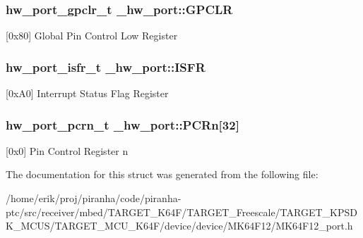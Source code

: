 \subsubsection[{\texorpdfstring{G\+P\+C\+LR}{GPCLR}}]{ {\bf hw\+\_\+port\+\_\+gpclr\+\_\+t} \+\_\+hw\+\_\+port\+::\+G\+P\+C\+LR}\hypertarget{struct__hw__port_a7be1ea0e268b67694b7a5b26c162271c}{}\label{struct__hw__port_a7be1ea0e268b67694b7a5b26c162271c}
\mbox{[}0x80\mbox{]} Global Pin Control Low Register 
\subsubsection[{\texorpdfstring{I\+S\+FR}{ISFR}}]{ {\bf hw\+\_\+port\+\_\+isfr\+\_\+t} \+\_\+hw\+\_\+port\+::\+I\+S\+FR}\hypertarget{struct__hw__port_add269ad945dcbd8df299be8865de7619}{}\label{struct__hw__port_add269ad945dcbd8df299be8865de7619}
\mbox{[}0x\+A0\mbox{]} Interrupt Status Flag Register 
\subsubsection[{\texorpdfstring{P\+C\+Rn}{PCRn}}]{ {\bf hw\+\_\+port\+\_\+pcrn\+\_\+t} \+\_\+hw\+\_\+port\+::\+P\+C\+Rn\mbox{[}32\mbox{]}}\hypertarget{struct__hw__port_aa4e9f4b2d1c9b0eaf3ce105949af7748}{}\label{struct__hw__port_aa4e9f4b2d1c9b0eaf3ce105949af7748}
\mbox{[}0x0\mbox{]} Pin Control Register n 

The documentation for this struct was generated from the following file\+:\begin{DoxyCompactItemize}
\item 
/home/erik/proj/piranha/code/piranha-\/ptc/src/receiver/mbed/\+T\+A\+R\+G\+E\+T\+\_\+\+K64\+F/\+T\+A\+R\+G\+E\+T\+\_\+\+Freescale/\+T\+A\+R\+G\+E\+T\+\_\+\+K\+P\+S\+D\+K\+\_\+\+M\+C\+U\+S/\+T\+A\+R\+G\+E\+T\+\_\+\+M\+C\+U\+\_\+\+K64\+F/device/device/\+M\+K64\+F12/M\+K64\+F12\+\_\+port.\+h\end{DoxyCompactItemize}
